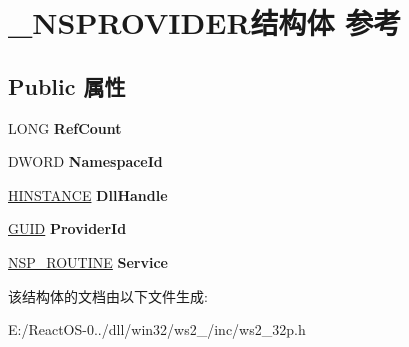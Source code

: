 \hypertarget{struct___n_s_p_r_o_v_i_d_e_r}{}\section{\+\_\+\+N\+S\+P\+R\+O\+V\+I\+D\+E\+R结构体 参考}
\label{struct___n_s_p_r_o_v_i_d_e_r}
\subsection*{Public 属性}
\begin{DoxyCompactItemize}
\item 
\mbox{\label{struct___n_s_p_r_o_v_i_d_e_r_aa79f2e64bfe76d45bf1edbdbe47a2691}} 
L\+O\+NG {\bfseries Ref\+Count}
\item 
\mbox{\label{struct___n_s_p_r_o_v_i_d_e_r_aebea15548a884725b8b95bf40839712c}} 
D\+W\+O\+RD {\bfseries Namespace\+Id}
\item 
\mbox{\label{struct___n_s_p_r_o_v_i_d_e_r_afc898fef26b3f787be69d2e4fcbb3880}} 
\hyperlink{interfacevoid}{H\+I\+N\+S\+T\+A\+N\+CE} {\bfseries Dll\+Handle}
\item 
\mbox{\label{struct___n_s_p_r_o_v_i_d_e_r_a43f2dc64acddd0506084ff93e793fbcc}} 
\hyperlink{interface_g_u_i_d}{G\+U\+ID} {\bfseries Provider\+Id}
\item 
\mbox{\label{struct___n_s_p_r_o_v_i_d_e_r_af107c5b0f83c1fe984459ff6b075b1a9}} 
\hyperlink{struct___n_s_p___r_o_u_t_i_n_e}{N\+S\+P\+\_\+\+R\+O\+U\+T\+I\+NE} {\bfseries Service}
\end{DoxyCompactItemize}


该结构体的文档由以下文件生成\+:\begin{DoxyCompactItemize}
\item 
E\+:/\+React\+O\+S-\/0../dll/win32/ws2\+\_/inc/ws2\+\_\+32p.\+h\end{DoxyCompactItemize}
